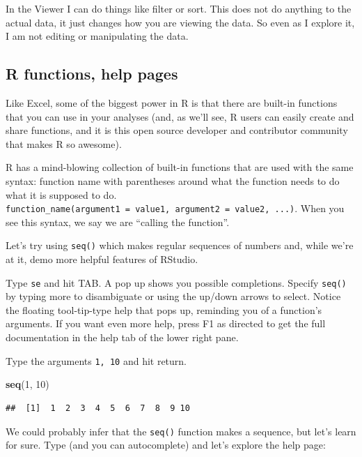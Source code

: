 \documentclass[]{book}
\newenvironment{Shaded}{\begin{snugshade}}{\end{snugshade}}
\newcommand{\DecValTok}[1]{\textcolor[rgb]{0.00,0.00,0.81}{#1}}
\newcommand{\KeywordTok}[1]{\textcolor[rgb]{0.13,0.29,0.53}{\textbf{#1}}}
\newcommand{\NormalTok}[1]{#1}
\begin{document}
In the Viewer I can do things like filter or sort. This does not do anything to the actual data, it just changes how you are viewing the data. So even as I explore it, I am not editing or manipulating the data.

\hypertarget{r-functions-help-pages}{%
\subsection{R functions, help pages}\label{r-functions-help-pages}}

Like Excel, some of the biggest power in R is that there are built-in functions that you can use in your analyses (and, as we'll see, R users can easily create and share functions, and it is this open source developer and contributor community that makes R so awesome).

R has a mind-blowing collection of built-in functions that are used with the same syntax: function name with parentheses around what the function needs to do what it is supposed to do. \texttt{function\_name(argument1\ =\ value1,\ argument2\ =\ value2,\ ...)}. When you see this syntax, we say we are ``calling the function''.

Let's try using \texttt{seq()} which makes regular sequences of numbers and, while we're at it, demo more helpful features of RStudio.

Type \texttt{se} and hit TAB. A pop up shows you possible completions. Specify \texttt{seq()} by typing more to disambiguate or using the up/down arrows to select. Notice the floating tool-tip-type help that pops up, reminding you of a function's arguments. If you want even more help, press F1 as directed to get the full documentation in the help tab of the lower right pane.

Type the arguments \texttt{1,\ 10} and hit return.

\begin{Shaded}
\begin{Highlighting}[]
\KeywordTok{seq}\NormalTok{(}\DecValTok{1}\NormalTok{, }\DecValTok{10}\NormalTok{)}
\end{Highlighting}
\end{Shaded}

\begin{verbatim}
##  [1]  1  2  3  4  5  6  7  8  9 10
\end{verbatim}

We could probably infer that the \texttt{seq()} function makes a sequence, but let's learn for sure. Type (and you can autocomplete) and let's explore the help page:
\end{document}
